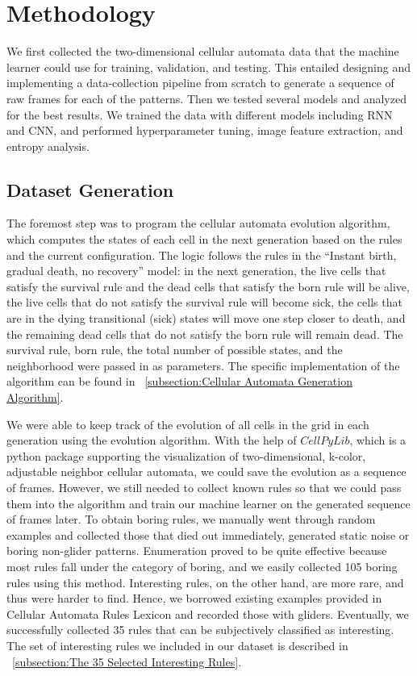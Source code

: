 \documentclass[12pt]{article}
\numberwithin{figure}{section} %
\begin{document}
\newpage
\section{Methodology}
\label{Methodology}
We first collected the two-dimensional cellular automata data that the machine learner could use for training, validation, and testing. This entailed designing and implementing a data-collection pipeline from scratch to generate a sequence of raw frames for each of the patterns. Then we tested several models and analyzed for the best results. We trained the data with different models including RNN and CNN, and performed hyperparameter tuning, image feature extraction, and entropy analysis. 

\subsection{Dataset Generation}
The foremost step was to program the cellular automata evolution algorithm, which computes the states of each cell in the next generation based on the rules and the current configuration. The logic follows the rules in the “Instant birth, gradual death, no recovery” model: in the next generation, the live cells that satisfy the survival rule and the dead cells that satisfy the born rule will be alive, the live cells that do not satisfy the survival rule will become sick, the cells that are in the dying transitional (sick) states will move one step closer to death, and the remaining dead cells that do not satisfy the born rule will remain dead. The survival rule, born rule, the total number of possible states, and the neighborhood were passed in as parameters. The specific implementation of the algorithm can be found in ~\ref{subsection:Cellular Automata Generation Algorithm}. 

We were able to keep track of the evolution of all cells in the grid in each generation using the evolution algorithm. With the help of $CellPyLib$, which is a python package supporting the visualization of two-dimensional, k-color, adjustable neighbor cellular automata, we could save the evolution as a sequence of frames. However, we still needed to collect known rules so that we could pass them into the algorithm and train our machine learner on the generated sequence of frames later. To obtain boring rules, we manually went through random examples and collected those that died out immediately, generated static noise or boring non-glider patterns. Enumeration proved to be quite effective because most rules fall under the category of boring, and we easily collected 105 boring rules using this method. Interesting rules, on the other hand, are more rare, and thus were harder to find. Hence, we borrowed existing examples provided in Cellular Automata Rules Lexicon and recorded those with gliders. Eventually, we successfully collected 35 rules that can be subjectively classified as interesting. The set of interesting rules we included in our dataset is described in ~\ref{subsection:The 35 Selected Interesting Rules}. 
\end{document}
